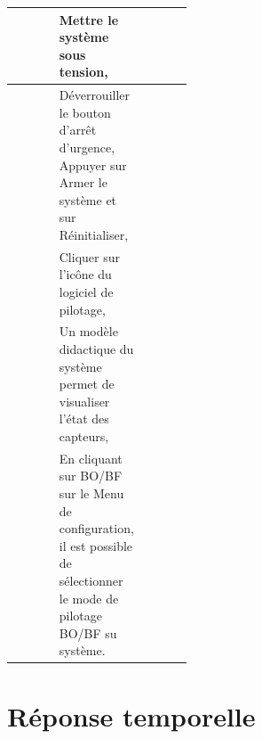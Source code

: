 

\begin{tabular}{|Ep{0.4\linewidth}|p{.5\linewidth}|}
\hline
& Mettre le système sous tension,
&\tabularnewline\hline
& Déverrouiller le bouton d'arrêt d'urgence,
Appuyer sur Armer le système et sur Réinitialiser,
&\tabularnewline\hline
 & Cliquer sur l'icône du logiciel de pilotage, 
&
\tabularnewline\hline
 & Un modèle didactique du système permet de visualiser l'état des capteurs,  
&\tabularnewline\hline
 & En cliquant sur BO/BF sur le Menu de configuration, il est possible de sélectionner le mode de pilotage BO/BF su système.
 &
\tabularnewline\hline
\end{tabular}

\section{Réponse temporelle}

\setcounter{rowcounter}{1}

